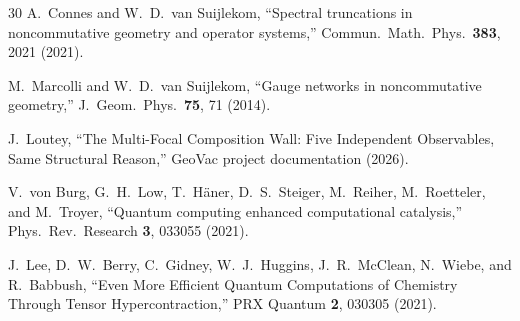 \documentclass[twocolumn,pra,amsmath,amssymb,superscriptaddress]{revtex4-2}
\begin{document}
\begin{thebibliography}{30}
 A.~Connes and W.~D.\ van Suijlekom,
  ``Spectral truncations in noncommutative geometry and operator
  systems,'' Commun.\ Math.\ Phys.\ \textbf{383}, 2021 (2021).

 M.~Marcolli and W.~D.\ van Suijlekom,
  ``Gauge networks in noncommutative geometry,'' J.~Geom.\ Phys.\
  \textbf{75}, 71 (2014).

 J.~Loutey, ``The Multi-Focal Composition Wall:
  Five Independent Observables, Same Structural Reason,'' GeoVac
  project documentation (2026).

 V.~von Burg, G.~H.~Low, T.~H{\"a}ner,
  D.~S.~Steiger, M.~Reiher, M.~Roetteler, and M.~Troyer, ``Quantum
  computing enhanced computational catalysis,'' Phys.\ Rev.\ Research
  \textbf{3}, 033055 (2021).

 J.~Lee, D.~W.~Berry, C.~Gidney, W.~J.~Huggins,
  J.~R.~McClean, N.~Wiebe, and R.~Babbush, ``Even More Efficient
  Quantum Computations of Chemistry Through Tensor Hypercontraction,''
  PRX Quantum \textbf{2}, 030305 (2021).

\end{thebibliography}
\end{document}
